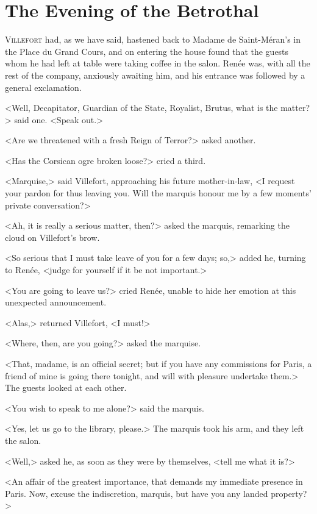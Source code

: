 \chapter{The Evening of the Betrothal} 

 \lettrine{V}{illefort} had, as we have said, hastened back to Madame de Saint-Méran's in the Place du Grand Cours, and on entering the house found that the guests whom he had left at table were taking coffee in the salon. Renée was, with all the rest of the company, anxiously awaiting him, and his entrance was followed by a general exclamation. 

 <Well, Decapitator, Guardian of the State, Royalist, Brutus, what is the matter?> said one. <Speak out.> 

 <Are we threatened with a fresh Reign of Terror?> asked another. 

 <Has the Corsican ogre broken loose?> cried a third. 

 <Marquise,> said Villefort, approaching his future mother-in-law, <I request your pardon for thus leaving you. Will the marquis honour me by a few moments' private conversation?> 

 <Ah, it is really a serious matter, then?> asked the marquis, remarking the cloud on Villefort's brow. 

 <So serious that I must take leave of you for a few days; so,> added he, turning to Renée, <judge for yourself if it be not important.> 

 <You are going to leave us?> cried Renée, unable to hide her emotion at this unexpected announcement. 

 <Alas,> returned Villefort, <I must!> 

 <Where, then, are you going?> asked the marquise. 

 <That, madame, is an official secret; but if you have any commissions for Paris, a friend of mine is going there tonight, and will with pleasure undertake them.> The guests looked at each other. 

 <You wish to speak to me alone?> said the marquis. 

 <Yes, let us go to the library, please.> The marquis took his arm, and they left the salon. 

 <Well,> asked he, as soon as they were by themselves, <tell me what it is?> 

 <An affair of the greatest importance, that demands my immediate presence in Paris. Now, excuse the indiscretion, marquis, but have you any landed property?> 

